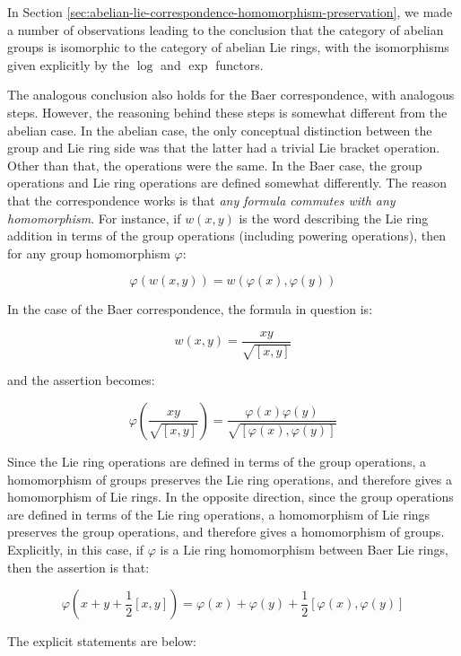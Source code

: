 \documentclass{ucetd}
\begin{document}
In Section
\ref{sec:abelian-lie-correspondence-homomorphism-preservation}, we
made a number of observations leading to the conclusion that the
category of abelian groups is isomorphic to the category of abelian
Lie rings, with the isomorphisms given explicitly by the $\log$ and
$\exp$ functors.

The analogous conclusion also holds for the Baer correspondence, with
analogous steps. However, the reasoning behind these steps is somewhat
different from the abelian case. In the abelian case, the only
conceptual distinction between the group and Lie ring side was that
the latter had a trivial Lie bracket operation. Other than that, the
operations were the same. In the Baer case, the group operations and
Lie ring operations are defined somewhat differently. The reason that
the correspondence works is that {\em any formula commutes with any
  homomorphism}. For instance, if $w(x,y)$ is the word describing the
Lie ring addition in terms of the group operations (including powering
operations), then for any group homomorphism $\varphi$:

$$\varphi(w(x,y)) = w(\varphi(x),\varphi(y))$$

In the case of the Baer correspondence, the formula in question is:

$$w(x,y) = \frac{xy}{\sqrt{[x,y]}}$$

and the assertion becomes:

$$\varphi\left(\frac{xy}{\sqrt{[x,y]}}\right) = \frac{\varphi(x)\varphi(y)}{\sqrt{[\varphi(x),\varphi(y)]}}$$

Since the Lie ring operations are defined in terms of the group
operations, a homomorphism of groups preserves the Lie ring
operations, and therefore gives a homomorphism of Lie rings. In the
opposite direction, since the group operations are defined in terms of
the Lie ring operations, a homomorphism of Lie rings preserves the
group operations, and therefore gives a homomorphism of
groups. Explicitly, in this case, if $\varphi$ is a Lie ring
homomorphism between Baer Lie rings, then the assertion is that:

$$\varphi\left(x + y + \frac{1}{2}[x,y]\right) = \varphi(x) + \varphi(y) + \frac{1}{2}[\varphi(x),\varphi(y)]$$

The explicit statements are below:
\end{document}
